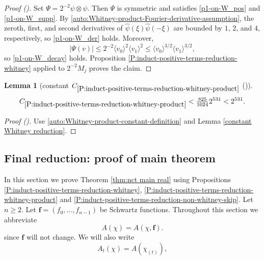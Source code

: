 \documentclass[12pt,reqno]{amsart}
\newcommand{\auto}{{({\tiny\faCar})}}
\theoremstyle{plain}
\newtheorem{lemma}[theorem]{Lemma}
\numberwithin{equation}{section}
\theoremstyle{remark}
\newcommand{\using}[1]{}
\begin{document}
\begin{proof}[Proof \auto]
Set $\Psi=2^{-2}\psi\otimes\psi$. Then $\Psi$ is symmetric and satisfies \eqref{p1-on-W_pos} and \eqref{p1-on-W_supp}. By \eqref{auto:Whitney-product-Fourier-derivative-assumption}, the zeroth, first, and second derivatives of $\widehat\psi(\xi)\widehat\psi(-\xi)$ are bounded by $1$, $2$, and $4$, respectively, so \eqref{p1-on-W_der} holds. Moreover,
\[
|\Psi(v)|
\le2^{-2}\langle v_0\rangle^2\langle v_1\rangle^2
\le\langle v_0\rangle^{3/2}\langle v_1\rangle^{3/2},
\]
so \eqref{p1-on-W_decay} holds. Proposition \ref{P:induct-positive-terms-reduction-whitney} applied to $2^{-2}M_j$ proves the claim.
\end{proof}

\begin{lemma}[constant $C_{\ref{P:induct-positive-terms-reduction-whitney-product}}$ \auto]\label{constant Whitney product reduction}\using{constant Whitney reduction}\using{P:induct-positive-terms-reduction-whitney-product}
\begin{equation}\label{constant Whitney product reduction bound}
C_{\ref{P:induct-positive-terms-reduction-whitney-product}}
<\tfrac{825}{1024}2^{531}<2^{531}.
\end{equation}
\end{lemma}
\begin{proof}[Proof \auto]
Use \eqref{auto:Whitney-product-constant-definition} and Lemma \ref{constant Whitney reduction}.
\end{proof}


\subsection{Final reduction: proof of main theorem}\label{sec:pfmainthm}
In this section we prove Theorem \ref{thm:nct main real} using Propositions \ref{P:induct-positive-terms-reduction-whitney}, \ref{P:induct-positive-terms-reduction-whitney-product} and \ref{P:induct-positive-terms-reduction-non-whitney-skip}.
Let $n\ge 2$.
Let $\mathbf{f}=(f_0,\dots,f_{n-1})$ be Schwartz functions.
Throughout this section we abbreviate
\begin{equation}\label{abbreviated twisted average}
A(\chi)=A(\chi,\mathbf f).
\end{equation}
since $\mathbf{f}$ will not change.
We will also write
\begin{equation}
    \label{avg_rescale}
    A_t(\chi) = A(\chi_{(t)}),
\end{equation}
\end{document}
